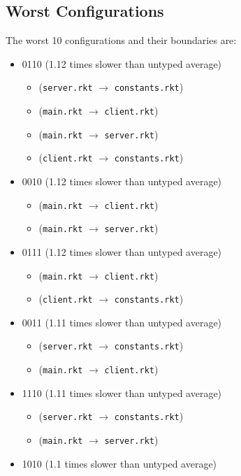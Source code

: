 \documentclass{article}
\newcommand{\mono}[1]{\texttt{#1}}
\begin{document}
\subsection{Worst Configurations}
The worst 10 configurations and their boundaries are:
\begin{itemize}
\item 0110 (1.12 times slower than untyped average)
  \begin{itemize}
  \item (\mono{server.rkt} $\rightarrow$ \mono{constants.rkt})
  \item (\mono{main.rkt} $\rightarrow$ \mono{client.rkt})
  \item (\mono{main.rkt} $\rightarrow$ \mono{server.rkt})
  \item (\mono{client.rkt} $\rightarrow$ \mono{constants.rkt})
  \end{itemize}
\item 0010 (1.12 times slower than untyped average)
  \begin{itemize}
  \item (\mono{main.rkt} $\rightarrow$ \mono{client.rkt})
  \item (\mono{main.rkt} $\rightarrow$ \mono{server.rkt})
  \end{itemize}
\item 0111 (1.12 times slower than untyped average)
  \begin{itemize}
  \item (\mono{main.rkt} $\rightarrow$ \mono{client.rkt})
  \item (\mono{client.rkt} $\rightarrow$ \mono{constants.rkt})
  \end{itemize}
\item 0011 (1.11 times slower than untyped average)
  \begin{itemize}
  \item (\mono{server.rkt} $\rightarrow$ \mono{constants.rkt})
  \item (\mono{main.rkt} $\rightarrow$ \mono{client.rkt})
  \end{itemize}
\item 1110 (1.11 times slower than untyped average)
  \begin{itemize}
  \item (\mono{server.rkt} $\rightarrow$ \mono{constants.rkt})
  \item (\mono{main.rkt} $\rightarrow$ \mono{server.rkt})
  \end{itemize}
\item 1010 (1.1 times slower than untyped average)

\end{itemize}
\end{document}
